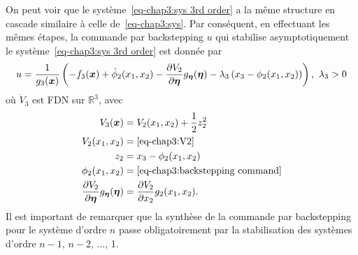 On peut voir que le système~\eqref{eq-chap3:sys 3rd order} a la même  structure en cascade similaire à celle de~\eqref{eq-chap3:sys}. Par conséquent, en effectuant les mêmes étapes, la commande par backstepping $u$ qui stabilise asymptotiquement le système~\eqref{eq-chap3:sys 3rd order} est donnée par 
\begin{equation}
	u = \frac{1}{g_3(\state)}\left(-f_3(\state) +\dot{\phi}_2(x_1,x_2) -\frac{\partial V_2}{\partial \boldsymbol{\eta}}g_{\boldsymbol{\eta}}(\boldsymbol{\eta}) - \lambda_3\left(x_3-\phi_2(x_1,x_2)\right)\right), \ \lambda_3>0
\end{equation}
où $\dot{V}_3$ est FDN sur $\mathbb{R}^3$, avec 
\begin{align}
	V_3(\bm{x})&= V_2(x_1,x_2) + \frac{1}{2} z_2^2\\
	V_2(x_1,x_2) &= \eqref{eq-chap3:V2}\\
	z_2 &= x_3-\phi_2(x_1,x_2)\\
	\phi_2(x_1,x_2) &= \eqref{eq-chap3:backstepping command}\\
	\frac{\partial V_2}{\partial \boldsymbol{\eta}}g_{\boldsymbol{\eta}}(\boldsymbol{\eta}) & =\frac{\partial V_2}{\partial x_2}g_{2}(x_1,x_2).
\end{align} 
Il est important de remarquer que la synthèse de la commande par backstepping pour le système  d'ordre $n$ passe obligatoirement par la stabilisation des systèmes d'ordre $n-1$, $n-2$, $\ldots$, 1.
